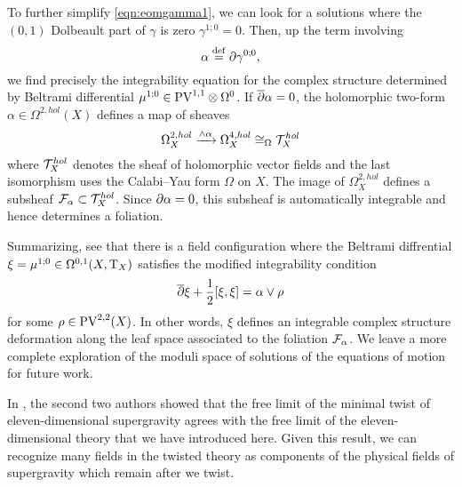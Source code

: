 To further simplify \eqref{eqn:eomgamma1}, we can look for a solutions where the $(0,1)$ Dolbeault part of $\gamma$ is zero $\gamma^{1;0} = 0$. 
Then, up the term involving 
\[
\alpha \overset{\rm def}{=} \partial \gamma^{0;0},
\]
we find precisely the integrability equation for the complex structure determined by Beltrami differential $\mu^{1;0} \in {\rm PV}^{1,1} \otimes \Omega^0$. 
If $\overline{\partial} \alpha = 0$, the holomorphic two-form $\alpha \in \Omega^{2,hol}(X)$ defines a map of sheaves
\[
\Omega^{2,hol}_X \xrightarrow{\wedge \alpha} \Omega^{4,hol}_X \cong_\Omega \mathcal T^{hol}_X
\]
where $\mathcal T^{hol}_X$ denotes the sheaf of holomorphic vector fields and the last isomorphism uses the Calabi--Yau form $\Omega$ on $X$.  
The image of $\Omega^{2,hol}_X$ defines a subsheaf $\mathcal F_{\alpha} \subset \mathcal T^{hol}_X$. 
Since $\partial \alpha = 0$, this subsheaf is automatically integrable and hence determines a foliation. 

Summarizing, see that there is a field configuration where the Beltrami diffrential $\xi = \mu^{1;0} \in \Omega^{0,1}(X, {\rm T}_X)$ satisfies the modified integrability condition
\[
\overline{\partial} \xi + \frac12  [\xi , \xi] = \alpha \vee \rho
\]
for some $\rho \in {\rm PV}^{2,2} (X)$. 
In other words, $\xi$ defines an integrable complex structure deformation along the leaf space associated to the foliation $\mathcal F_\alpha$. 
We leave a more complete exploration of the moduli space of solutions of the equations of motion for future work. 

In \cite{SWspinor}, the second two authors showed that the free limit of the minimal twist of eleven-dimensional supergravity agrees with the free limit of the eleven-dimensional theory that we have introduced here. 
Given this result, we can recognize many fields in the twisted theory as components of the physical fields of supergravity which remain after we twist. 

